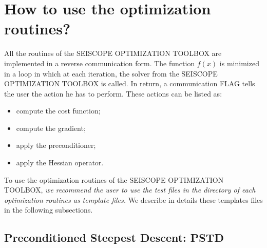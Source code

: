 \documentclass[a4paper,twoside,final,onecolumn,11pt,openright]{article}
\begin{document}


\newpage 
\section{How to use the optimization routines?}

All the routines of the SEISCOPE OPTIMIZATION TOOLBOX are implemented in a reverse communication form. The function $f(x)$ is minimized in a loop in which at each iteration, the solver from the SEISCOPE OPTIMIZATION TOOLBOX is called. In return, a communication FLAG tells the user the action he has to perform. These actions can be listed as: 
\begin{itemize}
 \item compute the cost function;  
 \item compute the gradient;
 \item apply the preconditioner; 
 \item apply the Hessian operator.
\end{itemize}


To use the optimization routines of the SEISCOPE OPTIMIZATION TOOLBOX, \textit{we recommend the user to use the test files in the directory of each optimization routines as template files.} We describe in details these templates files in the following subsections.  

\subsection{Preconditioned Steepest Descent: PSTD}
\end{document}
